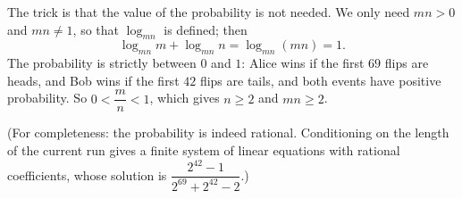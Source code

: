 The trick is that the value of the probability is not needed. We only need $mn>0$ and $mn\ne1$, so that $\log_{mn}$ is defined; then
\[\log_{mn}m+\log_{mn}n=\log_{mn}(mn)=\boxed{1}.\]
The probability is strictly between $0$ and $1$: Alice wins if the first $69$ flips are heads, and Bob wins if the first $42$ flips are tails, and both events have positive probability. So $0<\dfrac mn<1$, which gives $n\ge2$ and $mn\ge2$.

(For completeness: the probability is indeed rational. Conditioning on the length of the current run gives a finite system of linear equations with rational coefficients, whose solution is $\dfrac{2^{42}-1}{2^{69}+2^{42}-2}$.)
